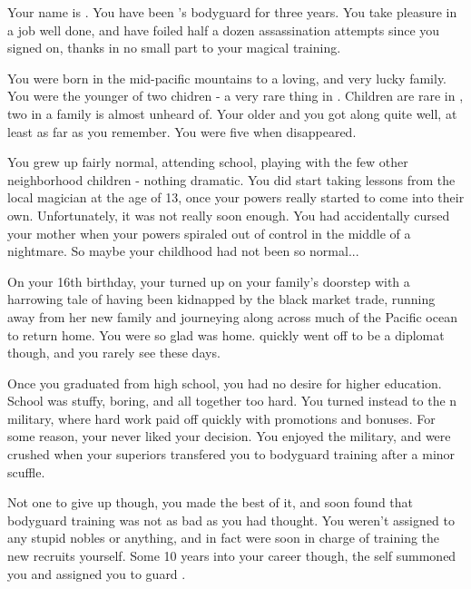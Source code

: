 \documentclass[char]{NeptuneBall}
\begin{document}
\name{\cBodyguard{}}

Your name is \cBodyguard{}. You have been \cDancer{}'s bodyguard for three years. You take pleasure in a job well done, and have foiled half a dozen assassination attempts since you signed on, thanks in no small part to your magical training.

You were born in the mid-pacific mountains to a loving, and very lucky family. You were the younger of two chidren - a very rare thing in \pPacifica{}. Children are rare in \pPacifica{}, two in a family is almost unheard of. Your older \cKGB{\sibling} \cKGB{} and you got along quite well, at least as far as you remember. You were five when \cKGB{\they} disappeared. 

You grew up fairly normal, attending school, playing with the few other neighborhood children - nothing dramatic. You did start taking lessons from the local magician at the age of 13, once your powers really started to come into their own. Unfortunately, it was not really soon enough.  You had accidentally cursed your mother when your powers spiraled out of control in the middle of a nightmare. So maybe your childhood had not been so normal...

On your 16th birthday, your \cKGB{\sibling} turned up on your family's doorstep with a harrowing tale of having been kidnapped by the black market trade, running away from her new family and journeying along across much of the Pacific ocean to return home. You were so glad \cKGB{\they} was home. \cKGB{\They} quickly went off to be a diplomat though, and you rarely see \cKGB{\them} these days.

Once you graduated from high school, you had no desire for higher education. School was stuffy, boring, and all together too hard. You turned instead to the \pPacifica{}n military, where hard work paid off quickly with promotions and bonuses. For some reason, your \cKGB{\sibling} never liked your decision. You enjoyed the military, and were crushed when your superiors transfered you to bodyguard training after a minor scuffle.

Not one to give up though, you made the best of it, and soon found that bodyguard training was not as bad as you had thought. You weren't assigned to any stupid nobles or anything, and in fact were soon in charge of training the new recruits yourself. Some 10 years into your career though, the \cPacificanRuler{\King} \cPacificanRuler{\them}self summoned you and assigned you to guard \cPacificanRuler{\them} \cDancer{\offspring} \cDancer{}.
\end{document}
